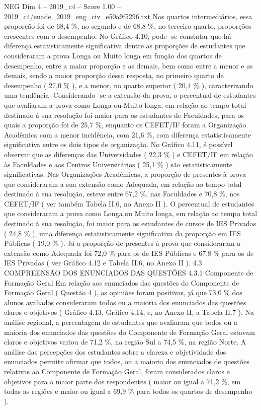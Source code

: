 \begin{textsample}{NEG Dim 4 – 2019\_c4 – Score 1.00 – 2019\_c4/enade\_2019\_eng\_civ\_e50a9f5296.txt}
Nos quartos intermediários, essa proporção foi de 68,4 \%, no segundo e de 68,8 \%, no terceiro quarto, proporções crescentes com o desempenho.
No Gráfico 4.10, pode -se constatar que há diferença estatisticamente significativa dentre as proporções de estudantes que consideraram a prova Longa ou Muito longa em função dos quartos de desempenho, entre a maior proporção e as demais, bem como entre a menor e as demais, sendo a maior proporção dessa resposta, no primeiro quarto de desempenho ( 27,0 \% ), e a menor, no quarto superior ( 20,4 \% ), caracterizando uma tendência.
Considerando -se a extensão da prova, o percentual de estudantes que avaliaram a prova como Longa ou Muito longa, em relação ao tempo total destinado à sua resolução foi maior para os estudantes de Faculdades, para os quais a proporção foi de 25,7 \%, enquanto os CEFET/IF foram a Organização Acadêmica com a menor incidência, com 21,6 \%, com diferença estatisticamente significativa entre os dois tipos de organização.
No Gráfico 4.11, é possível observar que as diferenças das Universidades ( 22,3 \% ) e CEFET/IF em relação às Faculdades e aos Centros Universitários ( 25,1 \% ) são estatisticamente significativas.
Nas Organizações Acadêmicas, a proporção de presentes à prova que consideraram a sua extensão como Adequada, em relação ao tempo total destinado à sua resolução, esteve entre 67,2 \%, nas Faculdades e 70,8 \%, nos CEFET/IF ( ver também Tabela II.6, no Anexo II ).
O percentual de estudantes que consideraram a prova como Longa ou Muito longa, em relação ao tempo total destinado à sua resolução, foi maior para os estudantes de cursos de IES Privadas ( 24,8 \% ), uma diferença estatisticamente significativa da proporção em IES Públicas ( 19,0 \% ).
Já a proporção de presentes à prova que consideraram a extensão como Adequada foi 72,0 \% para os de IES Públicas e 67,8 \% para os de IES Privadas ( ver Gráfico 4.12 e Tabela II.6, no Anexo II ). 4.3 COMPREENSÃO DOS ENUNCIADOS DAS QUESTÕES 4.3.1 Componente de Formação Geral Em relação aos enunciados das questões do Componente de Formação Geral ( Questão 4 ), as opiniões foram positivas, já que 73,0 \% dos alunos avaliados consideraram todos ou a maioria dos enunciados das questões claros e objetivos ( Gráfico 4.13, Gráfico 4.14, e, no Anexo II, a Tabela II.7 ).
Na análise regional, a percentagem de estudantes que avaliaram que todos ou a maioria dos enunciados das questões do Componente de Formação Geral estavam claros e objetivos variou de 71,2 \%, na região Sul a 74,5 \%, na região Norte.
A análise das percepções dos estudantes sobre a clareza e objetividade dos enunciados permite afirmar que todos, ou a maioria dos enunciados de questões relativas ao Componente de Formação Geral, foram considerados claros e objetivos para a maior parte dos respondentes ( maior ou igual a 71,2 \%, em todas as regiões e maior ou igual a 69,9 \% para todos os quartos de desempenho ).

\end{textsample}
